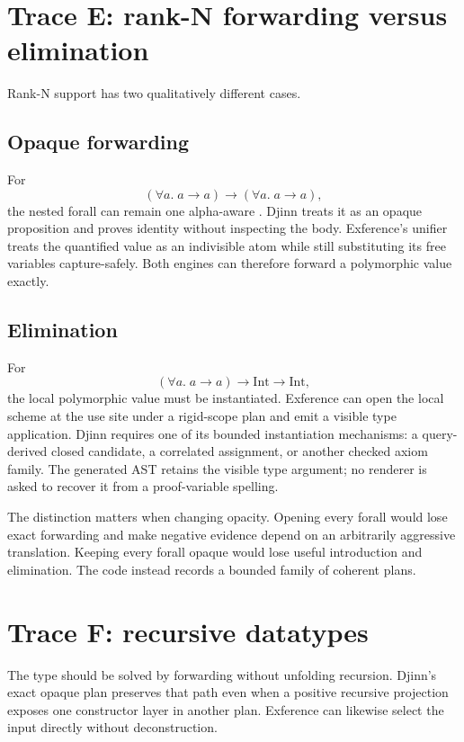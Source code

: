 \documentclass[10pt,letterpaper,oneside]{report}
\newcommand{\code}[1]{\texttt{\detokenize{#1}}}
\begin{document}
\section{Trace E: rank-N forwarding versus elimination}\label{sec:djex-rankn-trace}

Rank-N support has two qualitatively different cases.

\subsection{Opaque forwarding}

For
\[
  (\forall a.\;a \to a) \to (\forall a.\;a \to a),
\]
the nested forall can remain one alpha-aware \code{TypeAtom}. Djinn treats it as an opaque proposition and proves identity without inspecting the body. Exference's unifier treats the quantified value as an indivisible atom while still substituting its free variables capture-safely. Both engines can therefore forward a polymorphic value exactly.

\subsection{Elimination}

For
\[
  (\forall a.\;a \to a) \to \mathrm{Int} \to \mathrm{Int},
\]
the local polymorphic value must be instantiated. Exference can open the local scheme at the use site under a rigid-scope plan and emit a visible type application. Djinn requires one of its bounded instantiation mechanisms: a query-derived closed candidate, a correlated assignment, or another checked axiom family. The generated AST retains the visible type argument; no renderer is asked to recover it from a proof-variable spelling.

The distinction matters when changing opacity. Opening every forall would lose exact forwarding and make negative evidence depend on an arbitrarily aggressive translation. Keeping every forall opaque would lose useful introduction and elimination. The code instead records a bounded family of coherent plans.

\section{Trace F: recursive datatypes}

The type \code{List a -> List a} should be solved by forwarding without unfolding recursion. Djinn's exact opaque plan preserves that path even when a positive recursive projection exposes one constructor layer in another plan. Exference can likewise select the input directly without deconstruction.
\end{document}
